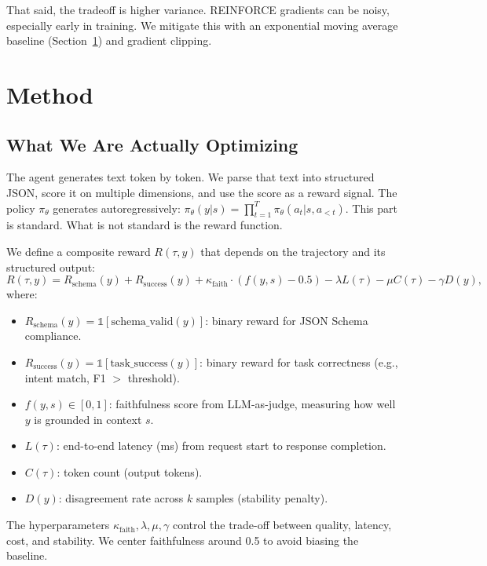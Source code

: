 \documentclass[11pt]{article}
\begin{document}
That said, the tradeoff is higher variance.
REINFORCE gradients can be noisy, especially early in training.
We mitigate this with an exponential moving average baseline (Section~\ref{sec:method}) and gradient clipping.

\section{Method}
\label{sec:method}

\subsection{What We Are Actually Optimizing}

The agent generates text token by token.
We parse that text into structured JSON, score it on multiple dimensions, and use the score as a reward signal.
The policy $\pi_\theta$ generates autoregressively: $\pi_\theta(y | s) = \prod_{t=1}^{T} \pi_\theta(a_t | s, a_{<t})$.
This part is standard.
What is not standard is the reward function.

We define a composite reward $R(\tau, y)$ that depends on the trajectory and its structured output:
\begin{equation}
R(\tau, y) = R_{\text{schema}}(y) + R_{\text{success}}(y) + \kappa_{\text{faith}} \cdot (f(y, s) - 0.5) - \lambda L(\tau) - \mu C(\tau) - \gamma D(y),
\end{equation}
where:
\begin{itemize}[leftmargin=12pt]
    \item $R_{\text{schema}}(y) = \mathbb{1}[\text{schema\_valid}(y)]$: binary reward for JSON Schema compliance.
    \item $R_{\text{success}}(y) = \mathbb{1}[\text{task\_success}(y)]$: binary reward for task correctness (e.g., intent match, F1 $>$ threshold).
    \item $f(y, s) \in [0,1]$: faithfulness score from LLM-as-judge, measuring how well $y$ is grounded in context $s$.
    \item $L(\tau)$: end-to-end latency (ms) from request start to response completion.
    \item $C(\tau)$: token count (output tokens).
    \item $D(y)$: disagreement rate across $k$ samples (stability penalty).
\end{itemize}

The hyperparameters $\kappa_{\text{faith}}, \lambda, \mu, \gamma$ control the trade-off between quality, latency, cost, and stability.
We center faithfulness around 0.5 to avoid biasing the baseline.
\end{document}
